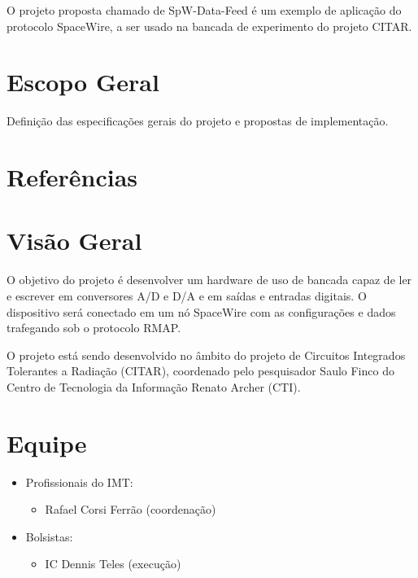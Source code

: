 O projeto proposta chamado de SpW-Data-Feed é um exemplo de aplicação do protocolo SpaceWire, a ser usado na bancada de experimento do projeto CITAR. 

\section{Escopo Geral}

Definição das especificações gerais do projeto e propostas de implementação.

\section{Referências}



\section{Visão Geral}

O objetivo do projeto é desenvolver um hardware de uso de bancada capaz de ler e escrever em conversores A/D e D/A e em saídas e entradas digitais. O dispositivo será conectado em um nó SpaceWire com as configurações e dados trafegando sob o protocolo RMAP.

O projeto está sendo desenvolvido no âmbito do projeto de Circuitos Integrados Tolerantes a Radiação (CITAR), coordenado pelo pesquisador Saulo Finco do Centro de Tecnologia da Informação Renato Archer (CTI). 


\section{Equipe}

\begin{itemize}
	\item Profissionais do IMT:
	\begin{itemize}
		 \item Rafael Corsi Ferrão (coordenação)
	\end{itemize}
	
	\item Bolsistas:
	\begin{itemize}
		\item IC Dennis Teles (execução)
	\end{itemize}
\end{itemize}


